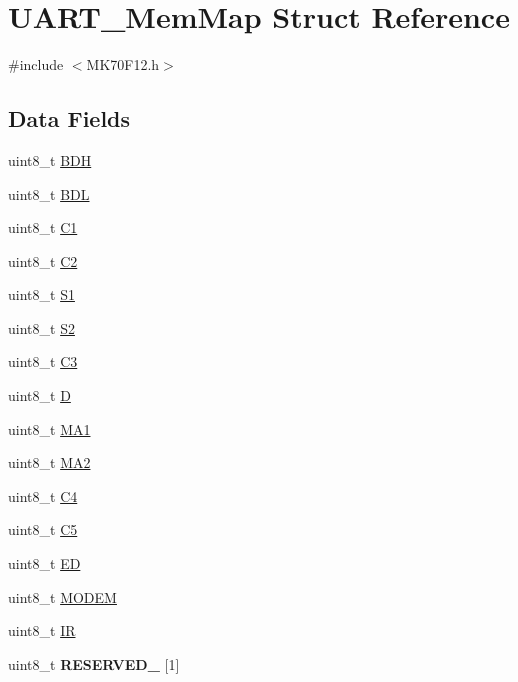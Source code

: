 \hypertarget{struct_u_a_r_t___mem_map}{}\section{U\+A\+R\+T\+\_\+\+Mem\+Map Struct Reference}
\label{struct_u_a_r_t___mem_map}


{\ttfamily \#include $<$M\+K70\+F12.\+h$>$}

\subsection*{Data Fields}
\begin{DoxyCompactItemize}
\item 
uint8\+\_\+t \hyperlink{struct_u_a_r_t___mem_map_a50621a015b23211a706aa74180fa4689}{B\+D\+H}
\item 
uint8\+\_\+t \hyperlink{struct_u_a_r_t___mem_map_ac846186ffd0e53fbac32cd57c6f9acc4}{B\+D\+L}
\item 
uint8\+\_\+t \hyperlink{struct_u_a_r_t___mem_map_ac2300c7c40e63ca712d0ec5180332f4b}{C1}
\item 
uint8\+\_\+t \hyperlink{struct_u_a_r_t___mem_map_a3e49aeb27f3613fd01a17a3c76e785b7}{C2}
\item 
uint8\+\_\+t \hyperlink{struct_u_a_r_t___mem_map_a7eb8df4e43194dbd9f1d9bd4ab742cca}{S1}
\item 
uint8\+\_\+t \hyperlink{struct_u_a_r_t___mem_map_a6107c55f4dba727e1a4e70f76acd7b20}{S2}
\item 
uint8\+\_\+t \hyperlink{struct_u_a_r_t___mem_map_a2e3cebfbfb9d96766397a8a102b8c29c}{C3}
\item 
uint8\+\_\+t \hyperlink{struct_u_a_r_t___mem_map_a3568c1640bf7dc0e1214cddcea1e8f0c}{D}
\item 
uint8\+\_\+t \hyperlink{struct_u_a_r_t___mem_map_a0150c1ad073843276caf61c950794c17}{M\+A1}
\item 
uint8\+\_\+t \hyperlink{struct_u_a_r_t___mem_map_ab6612fcc8e4f43ebae15982f6da2b567}{M\+A2}
\item 
uint8\+\_\+t \hyperlink{struct_u_a_r_t___mem_map_a6f18d698404d3f130cab66610aa526de}{C4}
\item 
uint8\+\_\+t \hyperlink{struct_u_a_r_t___mem_map_a1d9838b1b1a99857168954f51bc0802e}{C5}
\item 
uint8\+\_\+t \hyperlink{struct_u_a_r_t___mem_map_a0f318dc0e65102cb79566d2b22f064b2}{E\+D}
\item 
uint8\+\_\+t \hyperlink{struct_u_a_r_t___mem_map_a2eb889dcd179b02f46cf67c98792e130}{M\+O\+D\+E\+M}
\item 
uint8\+\_\+t \hyperlink{struct_u_a_r_t___mem_map_a8d1433df262b6816268f338d0c8e7d57}{I\+R}
\item 
\hypertarget{struct_u_a_r_t___mem_map_a72f8cd64b3c42233a2963b182c8e2d9e}{}uint8\+\_\+t {\bfseries R\+E\+S\+E\+R\+V\+E\+D\+\_} \mbox{[}1\mbox{]}\label{struct_u_a_r_t___mem_map_a72f8cd64b3c42233a2963b182c8e2d9e}


\end{DoxyCompactItemize}
